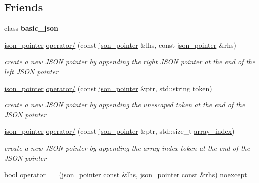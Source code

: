 \subsection*{Friends}
\begin{DoxyCompactItemize}
\item 
\mbox{\label{classnlohmann_1_1json__pointer_ada3100cdb8700566051828f1355fa745}} 
class {\bfseries basic\+\_\+json}
\item 
\mbox{\hyperlink{classnlohmann_1_1json__pointer}{json\+\_\+pointer}} \mbox{\hyperlink{classnlohmann_1_1json__pointer_a90a11fe6c7f37b1746a3ff9cb24b0d53}{operator/}} (const \mbox{\hyperlink{classnlohmann_1_1json__pointer}{json\+\_\+pointer}} \&lhs, const \mbox{\hyperlink{classnlohmann_1_1json__pointer}{json\+\_\+pointer}} \&rhs)
\begin{DoxyCompactList}\small\item\em create a new J\+S\+ON pointer by appending the right J\+S\+ON pointer at the end of the left J\+S\+ON pointer \end{DoxyCompactList}\item 
\mbox{\hyperlink{classnlohmann_1_1json__pointer}{json\+\_\+pointer}} \mbox{\hyperlink{classnlohmann_1_1json__pointer_a926c9065dbed1bedc17857a813f7a46f}{operator/}} (const \mbox{\hyperlink{classnlohmann_1_1json__pointer}{json\+\_\+pointer}} \&ptr, std\+::string token)
\begin{DoxyCompactList}\small\item\em create a new J\+S\+ON pointer by appending the unescaped token at the end of the J\+S\+ON pointer \end{DoxyCompactList}\item 
\mbox{\hyperlink{classnlohmann_1_1json__pointer}{json\+\_\+pointer}} \mbox{\hyperlink{classnlohmann_1_1json__pointer_a9f6bc6f4d4668b4e9a19d8b8ac29da4f}{operator/}} (const \mbox{\hyperlink{classnlohmann_1_1json__pointer}{json\+\_\+pointer}} \&ptr, std\+::size\+\_\+t \mbox{\hyperlink{classnlohmann_1_1json__pointer_ac53f5b79dd91da78743c437832f57ce4}{array\+\_\+index}})
\begin{DoxyCompactList}\small\item\em create a new J\+S\+ON pointer by appending the array-\/index-\/token at the end of the J\+S\+ON pointer \end{DoxyCompactList}\item 
bool \mbox{\hyperlink{classnlohmann_1_1json__pointer_a4667ef558c8c3f8a646bfda0c6654653}{operator==}} (\mbox{\hyperlink{classnlohmann_1_1json__pointer}{json\+\_\+pointer}} const \&lhs, \mbox{\hyperlink{classnlohmann_1_1json__pointer}{json\+\_\+pointer}} const \&rhs) noexcept

\end{DoxyCompactItemize}
